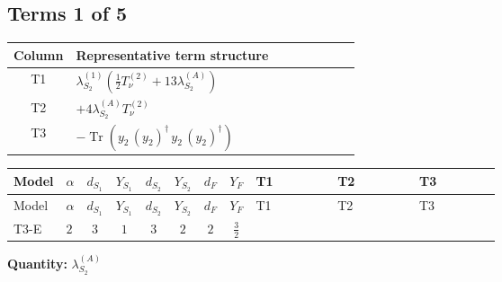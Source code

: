 \documentclass[8pt]{article}
\begin{document}
\begin{landscape}
\subsection*{Terms 1 of 5}
\begin{center}
\begin{tabular}{@{}c >{\raggedright\arraybackslash}p{0.82\linewidth}@{}}
\toprule
Column & Representative term structure \\
\midrule
T1 & \(\displaystyle {\lambda_{S_2}^{(1)}} \left(\frac{1}{2} T_{\nu}^{(2)}+13 {\lambda_{S_2}^{(A)}}\right)\) \\
\midrule
T2 & \(\displaystyle +4 {\lambda_{S_2}^{(A)}} T_{\nu}^{(2)}\) \\
\midrule
T3 & \(\displaystyle -\operatorname{Tr}\!\left({y_2}\,\left({y_2}\right)^{\dagger}\,{y_2}\,\left({y_2}\right)^{\dagger}\right)\) \\
\midrule
\bottomrule
\end{tabular}
\end{center}
\smallskip
\tiny
\begin{longtable}{@{}llcccccc >{\raggedright\arraybackslash}p{0.21\linewidth} >{\raggedright\arraybackslash}p{0.21\linewidth} >{\raggedright\arraybackslash}p{0.21\linewidth}@{}}
\toprule
Model & $\alpha$ & $d_{S_1}$ & $Y_{S_1}$ & $d_{S_2}$ & $Y_{S_2}$ & $d_F$ & $Y_F$ & T1 & T2 & T3 \\
\midrule
\endfirsthead
\toprule
Model & $\alpha$ & $d_{S_1}$ & $Y_{S_1}$ & $d_{S_2}$ & $Y_{S_2}$ & $d_F$ & $Y_F$ & T1 & T2 & T3 \\
\midrule
\endhead
T3-E & $2$ & $3$ & $1$ & $3$ & $2$ & $2$ & $\frac{3}{2}$ & \scriptsize\adjustbox{max width=\linewidth}{$\begin{gathered} {\lambda_{S_2}^{(1)}} \left(\frac{1}{2} T_{\nu}^{(2)}+13 {\lambda_{S_2}^{(A)}}\right)\end{gathered}$} & \scriptsize\adjustbox{max width=\linewidth}{$\begin{gathered} +4 {\lambda_{S_2}^{(A)}} T_{\nu}^{(2)}\end{gathered}$} & \scriptsize\adjustbox{max width=\linewidth}{$\begin{gathered} -\operatorname{Tr}\!\left({y_2}\,\left({y_2}\right)^{\dagger}\,{y_2}\,\left({y_2}\right)^{\dagger}\right)\end{gathered}$} \\
\midrule
\bottomrule
\end{longtable}
\clearpage
\noindent\textbf{Quantity: }$\lambda_{S_2}^{(A)}$\par\smallskip

\end{landscape}
\end{document}
